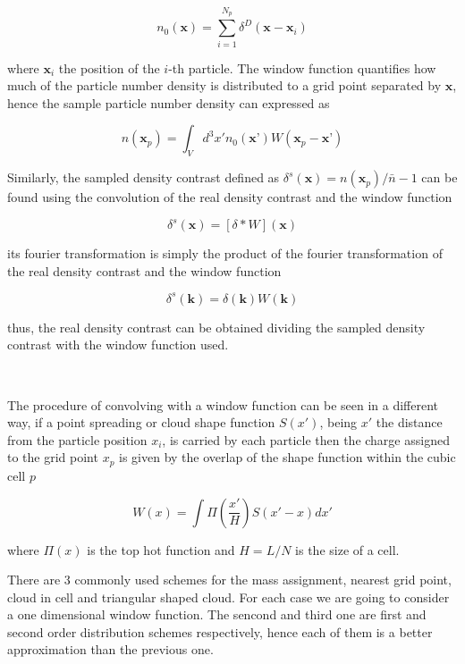 \[n_0(\textbf{x}) = \sum_{i=1}^{N_{p}} \delta^D ( \textbf{x} - \textbf{x}_i )\]

where $\textbf{x}_i$ the position of the $i$-th particle. The window function 
quantifies how much of the particle number density is distributed to a grid point 
separated by $\textbf{x}$, hence the sample particle number density can expressed as 

\[n(\textbf{x}_p) = \int_V d^3 x' n_0(\textbf{x'}) W(\textbf{x}_p-\textbf{x'})\]

Similarly, the sampled density contrast defined as $\delta^s(\textbf{x})=n(\textbf{x}_p)/\bar{n}-1$ 
can be found using the convolution of the real density contrast and the window function 

\begin{equation}
\delta^s(\textbf{x}) = [\delta*W](\textbf{x})
\label{df_conv}
\end{equation}

its fourier transformation is simply the product of the fourier transformation of the real 
density contrast and the window function 

\begin{equation}
\delta^s(\textbf{k}) = \delta(\textbf{k})W(\textbf{k})
\label{df_four}
\end{equation}

thus, the real density contrast can be obtained dividing the sampled density contrast with
the window function used. 

\

The procedure of convolving with a window function can be seen in a different way, if a 
point spreading or cloud shape function $S(x')$, being $x'$ the distance from the particle
position $x_i$, is carried by each particle then the charge assigned to the grid point $x_p$ 
is given by the overlap of the shape function within the cubic cell $p$

\[W(x)=\int \Pi \left(\frac{x'}{H} \right) S(x'-x)dx' \]

where $\Pi(x)$ is the top hot function and $H=L/N$ is the size of a cell. 

There are 3 commonly used schemes for the mass assignment, nearest grid point, cloud
in cell and triangular shaped cloud. For each case we are going to consider a one dimensional
window function. The sencond and third one are first and second order distribution schemes
respectively, hence each of them is a better approximation than the previous one. 

\

